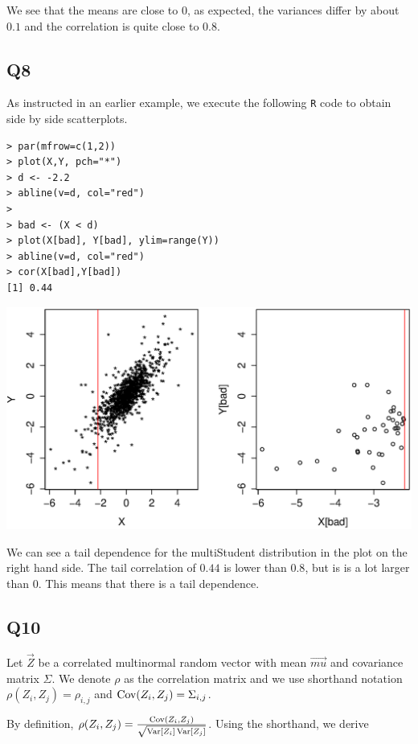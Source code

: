 We see that the means are close to $0$, as expected, the variances differ by about $0.1$ and the correlation is quite close to $0.8$.

\subsection*{Q8}

As instructed in an earlier example, we execute the following \verb|R| code to obtain side by side scatterplots.

\begin{verbatim}
> par(mfrow=c(1,2))
> plot(X,Y, pch="*")
> d <- -2.2
> abline(v=d, col="red")
> 
> bad <- (X < d)
> plot(X[bad], Y[bad], ylim=range(Y))
> abline(v=d, col="red")
> cor(X[bad],Y[bad])
[1] 0.44
\end{verbatim}

\includegraphics[scale=.6]{NL1_Q9_scatterplot.eps} 

We can see a tail dependence for the multiStudent distribution in the plot on the right hand side. The tail correlation of $0.44$ is lower than $0.8$, but is is a lot larger than $0$. This means that there is a tail dependence.

\subsection*{Q10}

Let $\vec{Z}$ be a correlated multinormal random vector with mean $\vec{mu}$ and covariance matrix $\Sigma$. We denote $\rho$ as the correlation matrix and we use shorthand notation $\rho(Z_i,Z_j) = \rho_{i,j}$ and $\operatorname{\text{Cov}}(Z_i,Z_j) = \Sigma_{i,j}$.

By definition, $\rho(Z_i,Z_j) = \frac{\operatorname{\text{Cov}}(Z_i,Z_j)}{\sqrt{\operatorname{\text{Var}}[Z_i]\operatorname{\text{Var}}[Z_j]}}$. Using the shorthand, we derive

